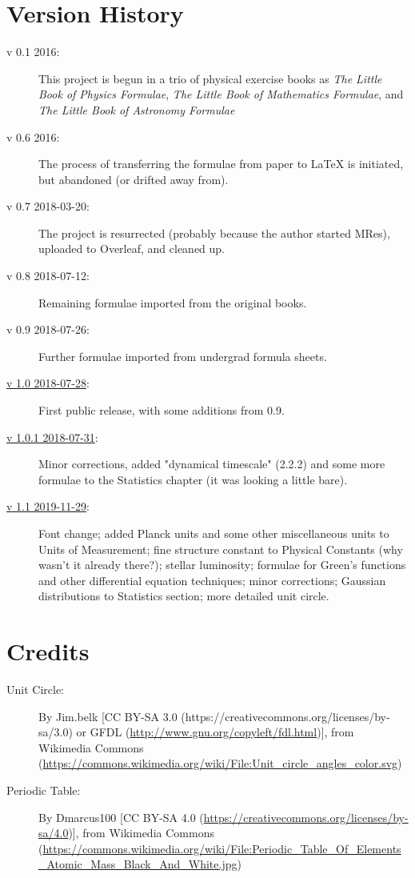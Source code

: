 \section{Version History}
\begin{description}
\item[v 0.1 2016:] This project is begun in a trio of physical exercise books as \textit{The Little Book of Physics Formulae}, \textit{The Little Book of Mathematics Formulae}, and \textit{The Little Book of Astronomy Formulae}
\item[v 0.6 2016:] The process of transferring the formulae from paper to LaTeX is initiated, but abandoned (or drifted away from).
\item[v 0.7 2018-03-20:] The project is resurrected (probably because the author started MRes), uploaded to Overleaf, and cleaned up.
\item[v 0.8 2018-07-12:] Remaining formulae imported from the original books.
\item[v 0.9 2018-07-26:] Further formulae imported from undergrad formula sheets.
\item[\href{http://www.webofworlds.net/s/ultimate-astrophysics-cheat-sheet_1-0.pdf}{v 1.0 2018-07-28}:] First public release, with some additions from 0.9.
\item[\href{http://www.webofworlds.net/s/ultimate-astrophysics-cheat-sheet_1-0-1.pdf}{v 1.0.1 2018-07-31}:] Minor corrections, added "dynamical timescale" (2.2.2) and some more formulae to the Statistics chapter (it was looking a little bare).
\item[\href{http://www.webofworlds.net/s/ultimate-astrophysics-cheat-sheet_1-2.pdf}{v 1.1 2019-11-29}:] Font change; added Planck units and some other miscellaneous units to Units of Measurement; fine structure constant to Physical Constants (why wasn't it already there?); stellar luminosity; formulae for Green's functions and other differential equation techniques; minor corrections; Gaussian distributions to Statistics section; more detailed unit circle.
\end{description}

\section{Credits}

\begin{description}
\item [Unit Circle:] By Jim.belk [CC BY-SA 3.0 (https://creativecommons.org/licenses/by-sa/3.0) or GFDL (\url{http://www.gnu.org/copyleft/fdl.html})], from Wikimedia Commons (\url{https://commons.wikimedia.org/wiki/File:Unit_circle_angles_color.svg})
\item [Periodic Table:] By Dmarcus100 [CC BY-SA 4.0 (\url{https://creativecommons.org/licenses/by-sa/4.0})], from Wikimedia Commons (\url{https://commons.wikimedia.org/wiki/File:Periodic_Table_Of_Elements_Atomic_Mass_Black_And_White.jpg})
\end{description}

